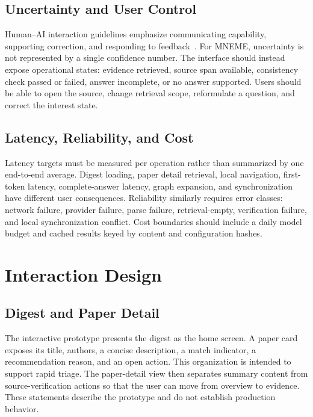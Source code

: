 \subsection{Uncertainty and User Control}

Human--AI interaction guidelines emphasize communicating capability, supporting correction, and responding to feedback~\cite{amershi2019guidelines}.
For MNEME, uncertainty is not represented by a single confidence number.
The interface should instead expose operational states: evidence retrieved, source span available, consistency check passed or failed, answer incomplete, or no answer supported.
Users should be able to open the source, change retrieval scope, reformulate a question, and correct the interest state.

\subsection{Latency, Reliability, and Cost}

Latency targets must be measured per operation rather than summarized by one end-to-end average.
Digest loading, paper detail retrieval, local navigation, first-token latency, complete-answer latency, graph expansion, and synchronization have different user consequences.
Reliability similarly requires error classes: network failure, provider failure, parse failure, retrieval-empty, verification failure, and local synchronization conflict.
Cost boundaries should include a daily model budget and cached results keyed by content and configuration hashes.

\section{Interaction Design}

\subsection{Digest and Paper Detail}

The interactive prototype presents the digest as the home screen.
A paper card exposes its title, authors, a concise description, a match indicator, a recommendation reason, and an open action.
This organization is intended to support rapid triage.
The paper-detail view then separates summary content from source-verification actions so that the user can move from overview to evidence.
These statements describe the prototype and do not establish production behavior.

